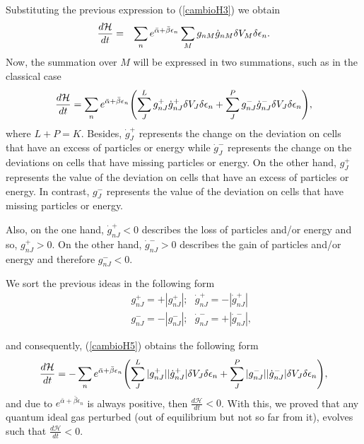 %
Substituting the previous expression to (\ref{cambioH3}) we obtain
%
\begin{eqnarray}
   \frac{d\mathcal{H}}{dt}&=&  \sum_n e^{\bar{\alpha}+\bar{\beta}\epsilon_n}\sum_M  g_{nM}\dot{g}_{nM} \delta V_M\delta \epsilon_n. \nonumber \\ \label{cambioH4}
\end{eqnarray}
%
Now, the summation over $M$ will be expressed in two summations, such as in the
classical case
%
\begin{equation}
    \frac{d\mathcal{H}}{dt}=\sum_n  e^{\bar{\alpha}+\bar{\beta}\epsilon_n}\left(\sum_J ^{L} g^{+}_{nJ}\dot{g}^{+}_{nJ}\de V_J \delta \epsilon_n+\sum^{P}_J  g^{-}_{nJ}\dot{g}^{-}_{nJ} \de V_J\delta \epsilon_n \right), \label{cambioH5}
\end{equation}
%
where $L+P=K$. Besides, $\dot{g}^{+}_{J}$ represents the change on the
deviation on cells that have an excess of particles or energy while
$\dot{g}^{-}_{J}$  represents the change on the deviations on cells that have
missing particles or energy.
On the other hand, $g^{+}_{J}$  represents the value of the deviation on cells
that have an excess of particles or energy. In contrast, $g^{-}_{J}$ represents
the value of the deviation on cells that have missing particles or energy.

Also, on the one hand, $\dot{g}^{+}_{nJ}<0$ describes the loss of particles
and/or energy and so, $g^{+}_{nJ}>0$. On the other hand, $\dot{g}^{-}_{nJ}>0$
describes the gain of particles and/or energy and therefore $g^{-}_{nJ}<0$.

We sort the previous ideas in the following form
%
\begin{eqnarray}
   &&g^{+}_{nJ}=+|g^{+}_{nJ}|; \ \ \  \dot{g}^{+}_{nJ}=-|\dot{g}^{+}_{nJ}| \nonumber \\
   &&g^{-}_{nJ}=-|g^{-}_{nJ}|; \ \ \ \dot{g}^{-}_{nJ}=+|\dot{g}^{-}_{nJ}| \label{separacion},
\end{eqnarray}
%


and consequently, (\ref{cambioH5}) obtains the following form
%
\begin{equation}
    \frac{d\mathcal{H}}{dt}=-\sum_n  e^{\bar{\alpha}+\bar{\beta}\epsilon_n}\left(\sum_J ^{L} |g^{+}_{nJ}||\dot{g}^{+}_{nJ}|\de V_J \delta \epsilon_n+\sum^{P}_J  |g^{-}_{nJ}||\dot{g}^{-}_{nJ}| \de V_J \delta \epsilon_n \right), \label{cambioH6}
\end{equation}
%
and due to $e^{\bar{\alpha}+\bar{\beta}\epsilon_n}$ is always positive, then
$\frac{d\mathcal{H}}{dt}<0$. With this, we proved that any quantum ideal gas perturbed
(out of equilibrium but not so far from it), evolves such that
$\frac{d\mathcal{H}}{dt}<0$.

